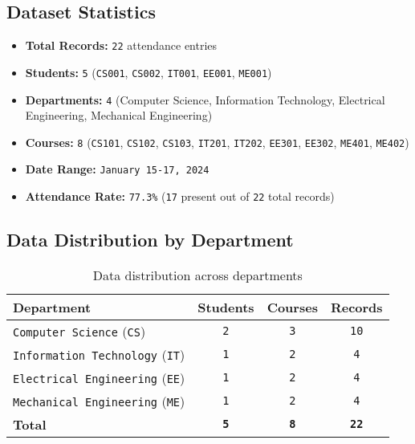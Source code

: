 \subsection{Dataset Statistics}

\begin{itemize}
    \item \textbf{Total Records:} \texttt{22} attendance entries
    \item \textbf{Students:} \texttt{5} (\texttt{CS001}, \texttt{CS002}, \texttt{IT001}, \texttt{EE001}, \texttt{ME001})
    \item \textbf{Departments:} \texttt{4} (Computer Science, Information Technology, Electrical Engineering, Mechanical Engineering)
    \item \textbf{Courses:} \texttt{8} (\texttt{CS101}, \texttt{CS102}, \texttt{CS103}, \texttt{IT201}, \texttt{IT202}, \texttt{EE301}, \texttt{EE302}, \texttt{ME401}, \texttt{ME402})
    \item \textbf{Date Range:} \texttt{January 15-17, 2024}
    \item \textbf{Attendance Rate:} \texttt{77.3\%} (\texttt{17} present out of \texttt{22} total records)
\end{itemize}

\subsection{Data Distribution by Department}

\begin{table}[H]
\centering
\begin{tabular}{|l|c|c|c|}
\hline
\textbf{Department} & \textbf{Students} & \textbf{Courses} & \textbf{Records} \\
\hline
\texttt{Computer Science} (\texttt{CS}) & \texttt{2} & \texttt{3} & \texttt{10} \\
\texttt{Information Technology} (\texttt{IT}) & \texttt{1} & \texttt{2} & \texttt{4} \\
\texttt{Electrical Engineering} (\texttt{EE}) & \texttt{1} & \texttt{2} & \texttt{4} \\
\texttt{Mechanical Engineering} (\texttt{ME}) & \texttt{1} & \texttt{2} & \texttt{4} \\
\hline
\textbf{Total} & \textbf{\texttt{5}} & \textbf{\texttt{8}} & \textbf{\texttt{22}} \\
\hline
\end{tabular}
\caption{Data distribution across departments}
\label{tab:data-distribution}
\end{table}

